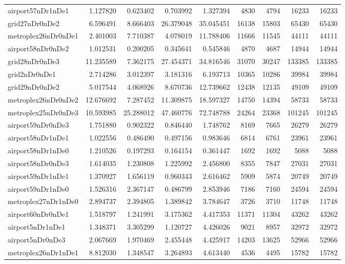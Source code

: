 \begin{longtable}{|l|r|r|r|r|r|r|r|r|}
airport57nDr1nDe1 & 1.127820 & 0.623402 & 0.703992 & 1.327394 & 4830 & 4794 & 16233 & 16233 \\
grid27nDr0nDe2 & 6.596491 & 8.666403 & 26.379048 & 35.045451 & 16138 & 15803 & 65430 & 65430 \\
metroplex26nDr0nDe1 & 2.401003 & 7.710387 & 4.078019 & 11.788406 & 11666 & 11545 & 44111 & 44111 \\
airport58nDr0nDe2 & 1.012531 & 0.200205 & 0.345641 & 0.545846 & 4870 & 4687 & 14944 & 14944 \\
grid28nDr0nDe3 & 11.235589 & 7.362175 & 27.454371 & 34.816546 & 31070 & 30247 & 133385 & 133385 \\
grid2nDr0nDe1 & 2.714286 & 3.012397 & 3.181316 & 6.193713 & 10365 & 10286 & 39984 & 39984 \\
grid29nDr0nDe2 & 5.017544 & 4.068926 & 8.670736 & 12.739662 & 12438 & 12135 & 49109 & 49109 \\
metroplex26nDr0nDe2 & 12.676692 & 7.287452 & 11.309875 & 18.597327 & 14750 & 14394 & 58733 & 58733 \\
metroplex25nDr0nDe3 & 10.593985 & 25.288012 & 47.460776 & 72.748788 & 24264 & 23368 & 101245 & 101245 \\
airport59nDr0nDe3 & 1.751880 & 0.902322 & 0.846440 & 1.748762 & 8169 & 7665 & 26279 & 26279 \\
airport58nDr1nDe1 & 1.022556 & 0.486490 & 0.497156 & 0.983646 & 6814 & 6761 & 23961 & 23961 \\
airport58nDr1nDe0 & 1.210526 & 0.197293 & 0.164154 & 0.361447 & 1692 & 1692 & 5088 & 5088 \\
airport58nDr0nDe3 & 1.614035 & 1.230808 & 1.225992 & 2.456800 & 8355 & 7847 & 27031 & 27031 \\
airport59nDr1nDe1 & 1.370927 & 1.656119 & 0.960343 & 2.616462 & 5909 & 5874 & 20749 & 20749 \\
airport59nDr1nDe0 & 1.526316 & 2.367147 & 0.486799 & 2.853946 & 7186 & 7160 & 24594 & 24594 \\
metroplex27nDr1nDe0 & 2.894737 & 2.394805 & 1.389842 & 3.784647 & 3726 & 3710 & 11748 & 11748 \\
airport60nDr0nDe1 & 1.518797 & 1.241991 & 3.175362 & 4.417353 & 11371 & 11304 & 43262 & 43262 \\
airport5nDr1nDe1 & 1.348371 & 3.305299 & 1.120727 & 4.426026 & 9021 & 8957 & 32972 & 32972 \\
airport5nDr0nDe3 & 2.067669 & 1.970469 & 2.455448 & 4.425917 & 14203 & 13625 & 52966 & 52966 \\
metroplex26nDr1nDe1 & 8.812030 & 1.348547 & 3.264893 & 4.613440 & 4536 & 4495 & 15782 & 15782 \\

\end{longtable}
